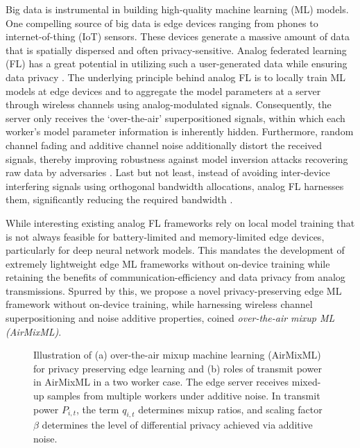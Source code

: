 \documentclass[conference,10pt]{IEEEtran}
\theoremstyle{definition}
\theoremstyle{definition}
\begin{document}
Big data is instrumental in building high-quality machine learning (ML) models. One compelling source of big data is edge devices ranging from phones to internet-of-thing (IoT) sensors. These devices generate a massive amount of data that is spatially dispersed and often privacy-sensitive. Analog federated learning (FL) has a great potential in utilizing such a user-generated data while ensuring data privacy \cite{zhu2019broadband,koda2020differentially,liu2020privacyforfree,elgabli2020harnessing}.
The underlying principle behind analog FL is to locally train ML models at edge devices and to aggregate the model parameters at a server through wireless channels using analog-modulated signals.
Consequently, the server only receives the `over-the-air’ superpositioned signals, within which each worker’s model parameter information is inherently hidden.
Furthermore, random channel fading \cite{elgabli2020harnessing} and additive channel noise \cite{koda2020differentially,liu2020privacyforfree} additionally distort the received signals, thereby improving robustness against model inversion attacks recovering raw data by adversaries \cite{Matt:CCS15}. Last but not least, instead of avoiding inter-device interfering signals using orthogonal bandwidth allocations, analog FL harnesses them, significantly reducing the required bandwidth \cite{zhu2019broadband}.

While interesting existing analog FL frameworks rely on local model training that is not always feasible for battery-limited and memory-limited edge devices, particularly for deep neural network models. This mandates the development of extremely lightweight edge ML frameworks without on-device training while retaining the benefits of communication-efficiency and data privacy from analog transmissions. Spurred by this, we propose a novel privacy-preserving edge ML framework without on-device training, while harnessing wireless channel superpositioning and noise additive properties, coined \emph{over-the-air mixup ML (AirMixML)}.

\begin{figure}[t]
	\centering
	\vspace{.5em}
	\caption{
		Illustration of (a) over-the-air mixup machine learning (AirMixML) for privacy preserving edge learning and (b) roles of transmit power in AirMixML in a two worker case.
		The edge server receives mixed-up samples from multiple workers under additive noise.
		In transmit power $P_{i, t}$, the term $q_{i, t}$ determines mixup ratios, and scaling factor $\beta$ determines the level of differential privacy achieved via additive noise.
	}
	\label{fig:AirMixML}
	\vspace{-2em}
\end{figure}
\end{document}
